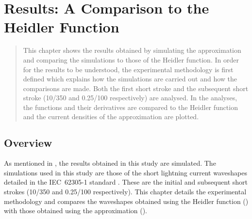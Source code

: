 
\chapter{Results: A Comparison to the Heidler Function} %

\label{ChapterResults} %


\begin{quote}
This chapter shows the results obtained by simulating the approximation and comparing the simulations to those of the Heidler function. In order for the results to be understood, the experimental methodology is first defined which explains how the simulations are carried out and how the comparisons are made. Both the first short stroke and the subsequent short stroke (10/350 and 0.25/100 respectively) are analysed. In the analyses, the functions and their derivatives are compared to the Heidler function and the current densities of the approximation are plotted.
\end{quote}


\section{Overview}
\label{sec:results_overview}
As mentioned in , the results obtained in this study are simulated. The simulations used in this study are those of the short lightning current waveshapes detailed in the IEC~62305-1 standard \cite{IEC623051}. These are the initial and subsequent short strokes (10/350 and 0.25/100 respectively). This chapter details the experimental methodology and compares the waveshapes obtained using the Heidler function () with those obtained using the approximation ().


